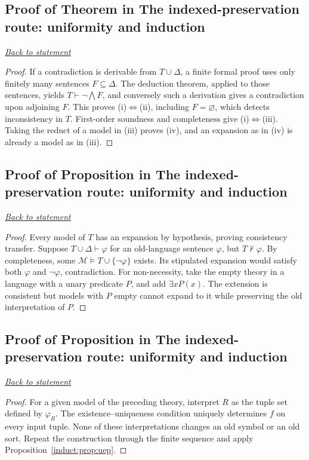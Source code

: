\documentclass[11pt,letterpaper]{article}
\theoremstyle{definition}\newtheorem{definition}[theorem]{Definition}\newtheorem{example}[theorem]{Example}
\theoremstyle{remark}\newtheorem{remark}[theorem]{Remark}
\newcommand{\backlink}[1]{\noindent\hyperref[#1]{\textit{Back to statement}}\par\smallskip}
\begin{document}
\subsection{Proof of Theorem in The indexed-preservation route: uniformity and induction}\label{br:induct:proof:1}\backlink{br:induct:stmt:1}
\begin{proof}
If a contradiction is derivable from \(T\cup\Delta\), a finite formal proof uses only finitely many sentences \(F\subseteq\Delta\). The deduction theorem, applied to those sentences, yields \(T\vdash\neg\bigwedge F\), and conversely such a derivation gives a contradiction upon adjoining \(F\). This proves (i)\(\Leftrightarrow\)(ii), including \(F=\varnothing\), which detects inconsistency in \(T\). First-order soundness and completeness give (i)\(\Leftrightarrow\)(iii). Taking the reduct of a model in (iii) proves (iv), and an expansion as in (iv) is already a model as in (iii).
\end{proof}

\subsection{Proof of Proposition in The indexed-preservation route: uniformity and induction}\label{br:induct:proof:2}\backlink{br:induct:stmt:2}
\begin{proof}
Every model of \(T\) has an expansion by hypothesis, proving consistency transfer. Suppose \(T\cup\Delta\vdash\varphi\) for an old-language sentence \(\varphi\), but \(T\not\vdash\varphi\). By completeness, some \(\mathcal M\models T\cup\{\neg\varphi\}\) exists. Its stipulated expansion would satisfy both \(\varphi\) and \(\neg\varphi\), contradiction. For non-necessity, take the empty theory in a language with a unary predicate \(P\), and add \(\exists xP(x)\). The extension is consistent but models with \(P\) empty cannot expand to it while preserving the old interpretation of \(P\).
\end{proof}

\subsection{Proof of Proposition in The indexed-preservation route: uniformity and induction}\label{br:induct:proof:3}\backlink{br:induct:stmt:3}
\begin{proof}
For a given model of the preceding theory, interpret $R$ as the tuple set defined by $\varphi_R$. The existence--uniqueness condition uniquely determines $f$ on every input tuple. None of these interpretations changes an old symbol or an old sort. Repeat the construction through the finite sequence and apply Proposition~\ref{induct:prop:uep}.
\end{proof}
\end{document}
